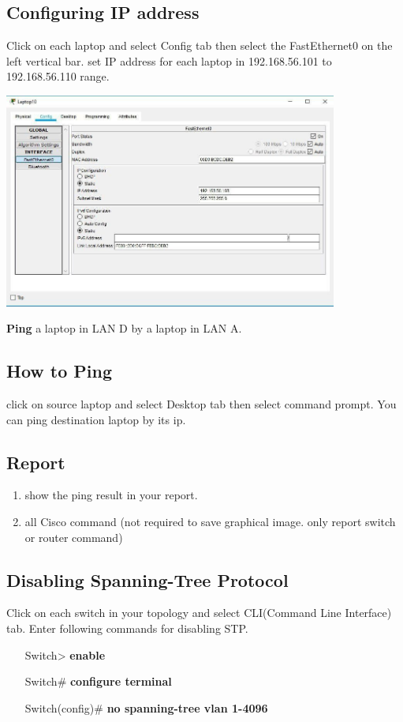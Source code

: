 \documentclass[10pt,a4paper]{article}
\numberwithin{equation}{section}
\numberwithin{figure}{section}
\numberwithin{table}{section}
\begin{document}
\subsection{Configuring IP address}
	Click  on each laptop and select Config tab then select the FastEthernet0 on the left vertical bar. set IP address for each laptop in 192.168.56.101 to 192.168.56.110 range. \\

	\begin{center}
        \includegraphics[height=200pt]{img/fig3.png}
    \end{center}
    
    \textbf{Ping} a laptop in LAN D by a laptop in LAN A.

\subsection*{How to Ping}

click on source laptop and select Desktop tab then select command prompt. You can ping destination laptop by its ip. 
\subsection*{Report}
	\begin{enumerate}
		\item show the ping result in your report.
		\item all Cisco command (not required to save graphical image. only report switch or router command)
	\end{enumerate}
    

\subsection{Disabling Spanning-Tree Protocol}
	Click on each switch in your topology and select CLI(Command Line Interface) tab. Enter following commands for disabling STP.
    \begin{itemize}
        \setlength{\itemindent}{50pt}
		\item [Switch>] \textbf{enable}
		\item [Switch\#] \textbf{configure terminal}
		\item [Switch(config)\#] \textbf{no spanning-tree vlan 1-4096}
	\end{itemize}
\end{document}
